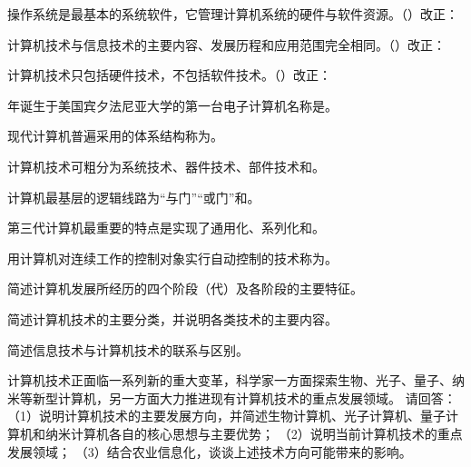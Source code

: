 \documentclass[a4paper,11pt]{article}
\begin{document}
\q 操作系统是最基本的系统软件，它管理计算机系统的硬件与软件资源。\quad（\quad）\quad 改正：\fixblank

\q 计算机技术与信息技术的主要内容、发展历程和应用范围完全相同。\quad（\quad）\quad 改正：\fixblank

\q 计算机技术只包括硬件技术，不包括软件技术。\quad（\quad）\quad 改正：\fixblank

 年诞生于美国宾夕法尼亚大学的第一台电子计算机名称是\fillblanks[2.0cm]。

\q 现代计算机普遍采用的体系结构称为\fillblanks[2.6cm]。

\q 计算机技术可粗分为系统技术、器件技术、部件技术和\fillblanks[2.0cm]。

\q 计算机最基层的逻辑线路为“与门”“或门”和\fillblanks[1.8cm]。

\q 第三代计算机最重要的特点是实现了通用化、系列化和\fillblanks[1.6cm]。

\q 用计算机对连续工作的控制对象实行自动控制的技术称为\fillblanks[2.0cm]。

\newpage
{}
\q 简述计算机发展所经历的四个阶段（代）及各阶段的主要特征。\anslines{2.4cm}

\q 简述计算机技术的主要分类，并说明各类技术的主要内容。\anslines{2.4cm}

\q 简述信息技术与计算机技术的联系与区别。\anslines{2.4cm}

\q 计算机技术正面临一系列新的重大变革，科学家一方面探索生物、光子、量子、纳米等新型计算机，另一方面大力推进现有计算机技术的重点发展领域。
请回答：
（1）说明计算机技术的主要发展方向，并简述生物计算机、光子计算机、量子计算机和纳米计算机各自的核心思想与主要优势；
（2）说明当前计算机技术的重点发展领域；
（3）结合农业信息化，谈谈上述技术方向可能带来的影响。\anslines{5cm}
\end{document}
